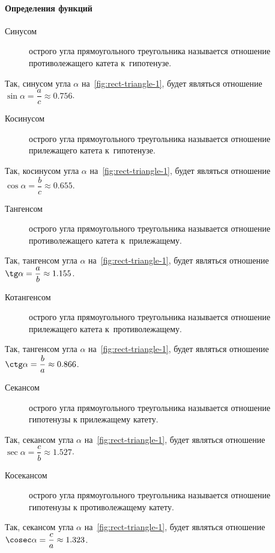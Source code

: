 \documentclass[]{scrartcl}
\begin{document}
\paragraph{Определения функций}
\begin{description}
	\item[Синусом] острого угла прямоугольного треугольника называется отношение противолежащего катета к~гипотенузе.
\end{description}
Так, синусом угла ${\textstyle \alpha}$ на~\ref{fig:rect-triangle-1}, будет являться отношение ${\textstyle \sin \alpha = \dfrac{a}{c} \approx 0.756}$.
\begin{description}
	\item[Косинусом] острого угла прямоугольного треугольника называется отношение прилежащего катета к~гипотенузе.
\end{description}
Так, косинусом угла ${\textstyle \alpha}$ на~\ref{fig:rect-triangle-1}, будет являться отношение ${\textstyle \cos \alpha = \dfrac{b}{c} \approx 0.655}$.
\begin{description}
	\item[Тангенсом] острого угла прямоугольного треугольника называется отношение противолежащего катета к~прилежащему.
\end{description}
Так, тангенсом угла ${\textstyle \alpha}$ на~\ref{fig:rect-triangle-1}, будет являться отношение ${\textstyle \tg \alpha = \dfrac{a}{b} \approx 1.155}$.
\begin{description}
	\item[Котангенсом] острого угла прямоугольного треугольника называется отношение прилежащего катета к~противолежащему.
\end{description}
Так, тангенсом угла ${\textstyle \alpha}$ на~\ref{fig:rect-triangle-1}, будет являться отношение ${\textstyle \ctg \alpha = \dfrac{b}{a} \approx 0.866}$.
\begin{description}
	\item[Секансом] острого угла прямоугольного треугольника называется отношение гипотенузы к прилежащему катету.
\end{description}
Так, секансом угла ${\textstyle \alpha}$ на~\ref{fig:rect-triangle-1}, будет являться отношение ${\textstyle \sec \alpha = \dfrac{c}{b} \approx 1.527}$.
\begin{description}
	\item[Косекансом] острого угла прямоугольного треугольника называется отношение гипотенузы к противолежащему катету.
\end{description}
Так, секансом угла ${\textstyle \alpha}$ на~\ref{fig:rect-triangle-1}, будет являться отношение ${\textstyle \cosec \alpha = \dfrac{c}{a} \approx 1.323}$.
\end{document}
